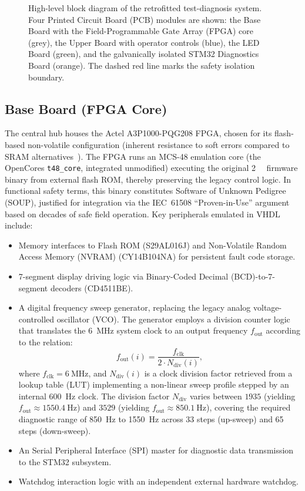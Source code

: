 \documentclass[journal, a4paper]{IEEEtran}
\newcommand{\VHDL}{VHDL}
\newif\iffirstFPGA  \firstFPGAtrue
\newcommand{\FPGA}{\iffirstFPGA Field-Programmable Gate Array (FPGA)\global\firstFPGAfalse\else FPGA\fi}
\newif\iffirstSPI   \firstSPItrue
\newcommand{\SPI}{\iffirstSPI Serial Peripheral Interface (SPI)\global\firstSPIfalse\else SPI\fi}
\newif\iffirstPCB   \firstPCBtrue
\newcommand{\PCB}{\iffirstPCB Printed Circuit Board (PCB)\global\firstPCBfalse\else PCB\fi}
\newif\iffirstNVRAM \firstNVRAMtrue
\newcommand{\NVRAM}{\iffirstNVRAM Non-Volatile Random Access Memory (NVRAM)\global\firstNVRAMfalse\else NVRAM\fi}
\newif\iffirstBCD   \firstBCDtrue
\newcommand{\BCD}{\iffirstBCD Binary-Coded Decimal (BCD)\global\firstBCDfalse\else BCD\fi}
\begin{document}
\begin{figure}[!t]
{
  }%
  \caption{High-level block diagram of the retrofitted test-diagnosis system. Four \PCB{} modules are shown: the Base Board with the \FPGA{} core (grey), the Upper Board with operator controls (blue), the LED Board (green), and the galvanically isolated STM32 Diagnostics Board (orange). The dashed red line marks the safety isolation boundary.}
  \label{fig:system_overview}
\end{figure}

\subsection{Base Board (\FPGA{} Core)}
The central hub houses the Actel A3P1000-PQG208 \FPGA{}, chosen for its flash-based non-volatile configuration (inherent resistance to soft errors compared to SRAM alternatives~\cite{latifshabgahi2009redundancy}). The \FPGA{} runs an MCS-48 emulation core (the OpenCores \texttt{t48\_core}, integrated unmodified) executing the original \SI{2}{\kilo\byte} firmware binary from external flash ROM, thereby preserving the legacy control logic. In functional safety terms, this binary constitutes Software of Unknown Pedigree (SOUP), justified for integration via the IEC~61508 ``Proven-in-Use'' argument based on decades of safe field operation. Key peripherals emulated in \VHDL{} include:
\begin{itemize}
  \item Memory interfaces to Flash ROM (S29AL016J) and \NVRAM{} (CY14B104NA) for persistent fault code storage.
  \item 7-segment display driving logic via \BCD{}-to-7-segment decoders (CD4511BE).
  \item A digital frequency sweep generator, replacing the legacy analog voltage-controlled oscillator (VCO). The generator employs a division counter logic that translates the \SI{6}{\mega\hertz} system clock to an output frequency $f_{\text{out}}$ according to the relation:
  \begin{equation}
    f_{\text{out}}(i) = \frac{f_{\text{clk}}}{2 \cdot N_{\text{div}}(i)},
  \end{equation}
  where $f_{\text{clk}} = \SI{6}{\mega\hertz}$, and $N_{\text{div}}(i)$ is a clock division factor retrieved from a lookup table (LUT) implementing a non-linear sweep profile stepped by an internal \SI{600}{\hertz} clock. The division factor $N_{\text{div}}$ varies between $1935$ (yielding $f_{\text{out}} \approx \SI{1550.4}{\hertz}$) and $3529$ (yielding $f_{\text{out}} \approx \SI{850.1}{\hertz}$), covering the required diagnostic range of \SI{850}{\hertz} to \SI{1550}{\hertz} across 33 steps (up-sweep) and 65 steps (down-sweep).
  \item An \SPI{} master for diagnostic data transmission to the STM32 subsystem.
  \item Watchdog interaction logic with an independent external hardware watchdog.
\end{itemize}
\end{document}
